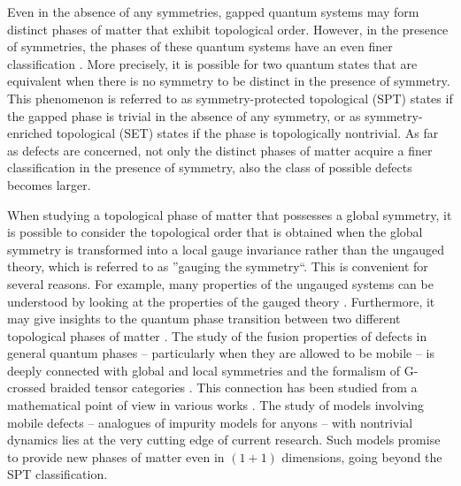 Even in the absence of any symmetries, gapped quantum systems may form distinct phases of matter that exhibit topological order. However, in the presence of symmetries, the phases of these quantum systems have an even finer classification \cite{Wen2002,SRFL08,Kitaev2009,FK10,CGW11,FK11,TPB11,LS12,LV12,FM13,EH13,NCMT14,WPS14,K14,F14,EN14,MFCV15,BRSX15,LV16}. More precisely, it is possible for two quantum states that are equivalent when there is no symmetry to be distinct in the presence of symmetry. This phenomenon is referred to as symmetry-protected topological (SPT) states \cite{CGLW13,Yoshida2015,Yoshida2017} if the gapped phase is trivial in the absence of any symmetry, or as symmetry-enriched topological (SET) states \cite{ENO10,MR13,WBV17} if the phase is topologically nontrivial. As far as defects are concerned, not only the distinct phases of matter acquire a finer classification in the presence of symmetry, also the class of possible defects becomes larger. 

When studying a topological phase of matter that possesses a global symmetry, it is possible to consider the topological order that is obtained when the global symmetry is transformed into a local gauge invariance rather than the ungauged theory, which is referred to as ''gauging the symmetry``. This is convenient for several reasons. For example, many properties of the ungauged systems can be understood by looking at the properties of the gauged theory \cite{LG12,HW12,Swingle2014,CG14}. Furthermore, it may give insights to the quantum phase transition between two different topological phases of matter \cite{BS09,BW10,BW11,BSS12}. 
The study of the fusion properties of defects in general quantum phases -- particularly when they are allowed to be mobile -- is deeply connected with global and local symmetries and the formalism of G-crossed braided tensor categories \cite{BBCW14}. This connection has been studied from a mathematical point of view in various works \cite{T00,ENO10,Turaev2010,CGPW16,EMJP18,CSZW18,D19,BJ19}. The study of models involving mobile defects -- analogues of impurity models for anyons -- with nontrivial dynamics lies at the very cutting edge of current research. Such models promise to provide new phases of matter even in $(1+1)$ dimensions, going beyond the SPT classification.

